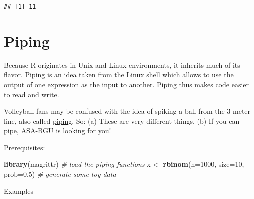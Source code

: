 \documentclass[]{book}
\newenvironment{Shaded}{\begin{snugshade}}{\end{snugshade}}
\newcommand{\KeywordTok}[1]{\textcolor[rgb]{0.13,0.29,0.53}{\textbf{#1}}}
\newcommand{\DataTypeTok}[1]{\textcolor[rgb]{0.13,0.29,0.53}{#1}}
\newcommand{\DecValTok}[1]{\textcolor[rgb]{0.00,0.00,0.81}{#1}}
\newcommand{\FloatTok}[1]{\textcolor[rgb]{0.00,0.00,0.81}{#1}}
\newcommand{\StringTok}[1]{\textcolor[rgb]{0.31,0.60,0.02}{#1}}
\newcommand{\CommentTok}[1]{\textcolor[rgb]{0.56,0.35,0.01}{\textit{#1}}}
\newcommand{\OperatorTok}[1]{\textcolor[rgb]{0.81,0.36,0.00}{\textbf{#1}}}
\newcommand{\NormalTok}[1]{#1}
\theoremstyle{definition}
\theoremstyle{definition}
\theoremstyle{definition}
\theoremstyle{remark}
\let\BeginKnitrBlock\begin \let\EndKnitrBlock\end
\begin{document}
\begin{verbatim}
## [1] 11
\end{verbatim}

\section{Piping}\label{piping}

Because R originates in Unix and Linux environments, it inherits much of
its flavor.
\href{http://ryanstutorials.net/linuxtutorial/piping.php}{Piping} is an
idea taken from the Linux shell which allows to use the output of one
expression as the input to another. Piping thus makes code easier to
read and write.

\BeginKnitrBlock{remark}
{}Volleyball fans may be confused with the idea
of spiking a ball from the 3-meter line, also called
\href{https://www.youtube.com/watch?v=GWW15Nr1lQM}{piping}. So: (a)
These are very different things. (b) If you can pipe,
\href{http://in.bgu.ac.il/sport/Pages/asa.aspx}{ASA-BGU} is looking for
you!
\EndKnitrBlock{remark}

Prerequisites:

\begin{Shaded}
\begin{Highlighting}[]
\KeywordTok{library}\NormalTok{(magrittr) }\CommentTok{# load the piping functions}
\NormalTok{x <-}\StringTok{ }\KeywordTok{rbinom}\NormalTok{(}\DataTypeTok{n=}\DecValTok{1000}\NormalTok{, }\DataTypeTok{size=}\DecValTok{10}\NormalTok{, }\DataTypeTok{prob=}\FloatTok{0.5}\NormalTok{) }\CommentTok{# generate some toy data}
\end{Highlighting}
\end{Shaded}

Examples

\begin{Shaded}
\end{Shaded}
\end{document}
